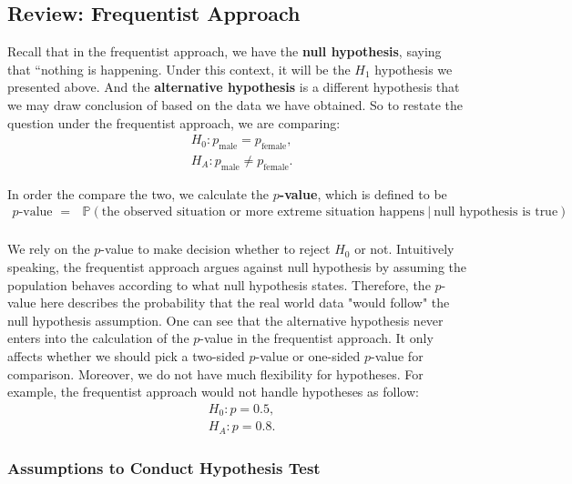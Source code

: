 \documentclass{article}
\begin{document}
\subsection{Review: Frequentist Approach}

Recall that in the frequentist approach, we have the \textbf{null hypothesis}, saying that ``nothing is happening. Under this context, it will be the $H_1$ hypothesis we presented above. And the \textbf{alternative hypothesis} is a different hypothesis that we may draw conclusion of based on the data we have obtained. So to restate the question under the frequentist approach, we are comparing:
\begin{align*}
	& H_0: p_\text{male} = p_\text{female},\\
	& H_A: p_\text{male} \neq p_\text{female}.
\end{align*} 

In order the compare the two, we calculate the \textbf{$p$-value}, which is defined to be
\begin{align*}
\text{$p$-value }= & \mathbb{P}(\text{the observed situation or more extreme situation happens}~|~\text{null hypothesis is true})\\
\end{align*}

We rely on the $p$-value to make decision whether to reject $H_0$ or not. Intuitively speaking, the frequentist approach argues against null hypothesis by assuming the population behaves according to what null hypothesis states. Therefore, the $p$-value here describes the probability that the real world data "would follow" the null hypothesis assumption. One can see that the alternative hypothesis never enters into the calculation of the $p$-value in the frequentist approach. It only affects whether we should pick a two-sided $p$-value or one-sided $p$-value for comparison. Moreover, we do not have much flexibility for hypotheses. For example, the frequentist approach would not handle hypotheses as follow:
\begin{align*}
& H_0: p = 0.5,\\
& H_A: p = 0.8.
\end{align*}

\subsubsection*{Assumptions to Conduct Hypothesis Test}
\end{document}
